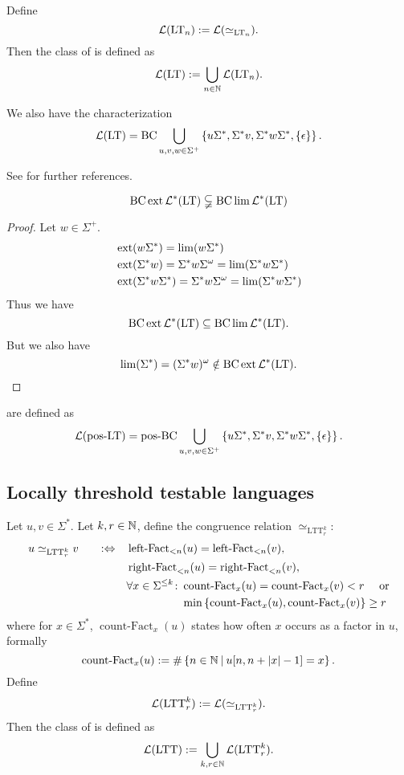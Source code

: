 Define
\[ \mathcal{L}(\textup{\textrm{LT}}_n) := \mathcal{L}(\simeq_{\text{LT}_n}) . \]
Then the class of  is defined as
\[ \mathcal{L}(\textup{\textrm{LT}}) := \bigcup_{n\in\mathbb{N}} \mathcal{L}(\textup{\textrm{LT}}_n) . \]

We also have the characterization
\[ \Lang(\LT) = \BC \bigcup_{u,v,w \in \Sigma^+} \Set{u\Sigma^*, \Sigma^* v, \Sigma^* w \Sigma^*, \Set{\epsilon}} . \]

See \cite[Section 2.5]{ConcHierR104} for further references.

\begin{theorem}
\[ \operatorname{BC} \operatorname{ext} \mathcal{L}^* (\textup{\textrm{LT}}) \subsetneqq \operatorname{BC} \lim \mathcal{L}^*(\textup{\textrm{LT}})  \]

\begin{proof}
Let $w \in \Sigma^+$.
\begin{align*}
& \operatorname{ext} (w \Sigma^*) = \lim(w \Sigma^*) \\
& \operatorname{ext}( \Sigma^* w) = \Sigma^* w \Sigma^\omega = \lim( \Sigma^* w \Sigma^* ) \\
& \operatorname{ext}( \Sigma^* w \Sigma^*) = \Sigma^* w \Sigma^\omega = \lim( \Sigma^* w \Sigma^* )
\end{align*}
Thus we have
\[ \operatorname{BC} \operatorname{ext} \mathcal{L}^* (\textup{\textrm{LT}}) \subseteq \operatorname{BC} \lim \mathcal{L}^*(\textup{\textrm{LT}}) . \]
But we also have
\[ \lim(\Sigma^*) = (\Sigma^* w)^\omega \notin \operatorname{BC} \operatorname{ext} \mathcal{L}^* (\textup{\textrm{LT}}) . \]
\end{proof}
\end{theorem}

 are defined as
\[ \Lang(\mathtext{pos-LT}) = \operatorname{pos-BC} \bigcup_{u,v,w \in \Sigma^+} \Set{u\Sigma^*, \Sigma^* v, \Sigma^* w \Sigma^*, \Set{\epsilon}} . \]

\subsection{Locally threshold testable languages}
\label{lang:LTT}
Let $u,v \in \Sigma^*$. Let $k,r \in \mathbb{N}$, define the congruence relation $\simeq_{\text{LTT}^k_r}$:
\begin{alignat*}{3}
u \simeq_{\text{LTT}^k_r} v \ \ \ && :\Leftrightarrow \ \ \ & \operatorname{left-Fact}_{<n}(u) = \operatorname{left-Fact}_{<n}(v) , \\
&&& \operatorname{right-Fact}_{<n}(u) = \operatorname{right-Fact}_{<n}(v) , \\
&&& \begin{aligned}
\forall x \in \Sigma^{\le k} \colon & \operatorname{count-Fact}_x(u) = \operatorname{count-Fact}_x(v) < r \ \ \ \ \text{or} \\
& \min \Set{\operatorname{count-Fact}_x(u), \operatorname{count-Fact}_x(v)} \ge r
\end{aligned}
\end{alignat*}
where for $x \in \Sigma^*$, $\operatorname{count-Fact}_x(u)$ states how often $x$ occurs as a factor in $u$, formally
\[ \operatorname{count-Fact}_x(u) := \#\Set{n \in \N}{u[n,n+\vert x \vert - 1] = x} . \]
Define
\[ \mathcal{L}(\text{LTT}^k_r) := \mathcal{L}(\simeq_{\text{LTT}^k_r}). \]
Then the class of  is defined as
\[ \mathcal{L}(\textup{\textrm{LTT}}) := \bigcup_{k,r\in\mathbb{N}} \mathcal{L}(\text{LTT}^k_r) . \]

